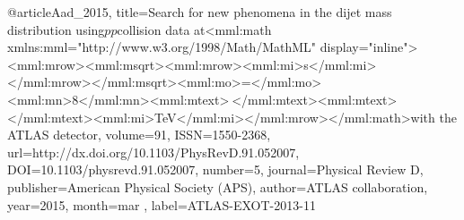 @article{Aad_2015, 
    title={Search for new phenomena in the dijet mass distribution using$pp$collision data at<mml:math xmlns:mml="http://www.w3.org/1998/Math/MathML" display="inline"><mml:mrow><mml:msqrt><mml:mrow><mml:mi>s</mml:mi></mml:mrow></mml:msqrt><mml:mo>=</mml:mo><mml:mn>8</mml:mn><mml:mtext> </mml:mtext><mml:mtext> </mml:mtext><mml:mi>TeV</mml:mi></mml:mrow></mml:math>with the ATLAS detector}, 
    volume={91}, 
    ISSN={1550-2368}, 
    url={http://dx.doi.org/10.1103/PhysRevD.91.052007}, 
    DOI={10.1103/physrevd.91.052007}, 
    number={5}, 
    journal={Physical Review D}, 
    publisher={American Physical Society (APS)}, 
    author={ATLAS collaboration}, 
    year={2015}, 
    month=mar ,
    label={ATLAS-EXOT-2013-11}
}

